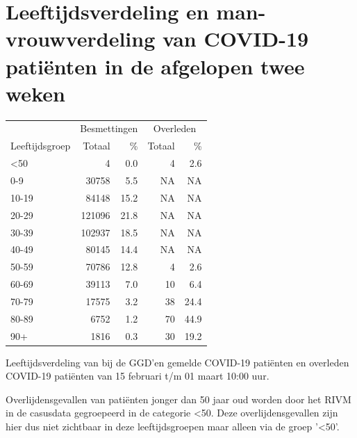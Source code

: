 \documentclass[
  english,
  man,floatsintext]{apa6}
\begin{document}
\newpage

\hypertarget{leeftijdsverdeling-en-man-vrouwverdeling-van-covid-19-patiuxebnten-in-de-afgelopen-twee-weken}{%
\section{Leeftijdsverdeling en man-vrouwverdeling van COVID-19 patiënten in de afgelopen twee weken}\label{leeftijdsverdeling-en-man-vrouwverdeling-van-covid-19-patiuxebnten-in-de-afgelopen-twee-weken}}

\begin{table}
\centering\begingroup\fontsize{11}{13}\selectfont

\begin{threeparttable}
\begin{tabular}{lrrrr}
\toprule
\multicolumn{1}{c}{ } & \multicolumn{2}{c}{Besmettingen} & \multicolumn{2}{c}{Overleden} \\
\cmidrule(l{3pt}r{3pt}){2-3} \cmidrule(l{3pt}r{3pt}){4-5}
Leeftijdsgroep & Totaal & \% & Totaal & \%\\
\midrule
<50 & 4 & 0.0 & 4 & 2.6\\
0-9 & 30758 & 5.5 & NA & NA\\
10-19 & 84148 & 15.2 & NA & NA\\
20-29 & 121096 & 21.8 & NA & NA\\
30-39 & 102937 & 18.5 & NA & NA\\
40-49 & 80145 & 14.4 & NA & NA\\
50-59 & 70786 & 12.8 & 4 & 2.6\\
60-69 & 39113 & 7.0 & 10 & 6.4\\
70-79 & 17575 & 3.2 & 38 & 24.4\\
80-89 & 6752 & 1.2 & 70 & 44.9\\
90+ & 1816 & 0.3 & 30 & 19.2\\
\bottomrule
\end{tabular}
\begin{tablenotes}
\item[1] Leeftijdsverdeling van bij de GGD’en gemelde COVID-19 patiënten en overleden COVID-19 patiënten van 15 februari t/m 01 maart 10:00 uur.
\item[2] Overlijdensgevallen van patiënten jonger dan 50 jaar oud worden door het RIVM in de casusdata gegroepeerd in de categorie <50. Deze overlijdensgevallen zijn hier dus niet zichtbaar in deze leeftijdsgroepen maar alleen via de groep '<50'.
\end{tablenotes}
\end{threeparttable}
\endgroup{}
\end{table}
\end{document}

